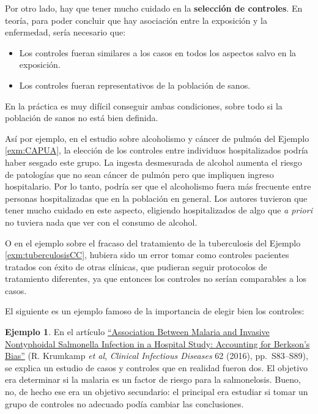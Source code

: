 \documentclass[
]{book}
\providecommand{\tightlist}{%
  \setlength{\itemsep}{0pt}\setlength{\parskip}{0pt}}
\theoremstyle{definition}
\theoremstyle{definition}
\newtheorem{example}{Ejemplo}[chapter]
\theoremstyle{definition}
\theoremstyle{definition}
\theoremstyle{remark}
\begin{document}
Por otro lado, hay que tener mucho cuidado en la \textbf{selección de controles}. En teoría, para poder concluir que hay asociación entre la exposición y la enfermedad, sería necesario que:

\begin{itemize}
\tightlist
\item
  Los controles fueran similares a los casos en todos los aspectos salvo en la exposición.
\item
  Los controles fueran representativos de la población de sanos.
\end{itemize}

En la práctica es muy difícil conseguir ambas condiciones, sobre todo si la población de sanos no está bien definida.

Así por ejemplo, en el estudio sobre alcoholismo y cáncer de pulmón del Ejemplo \ref{exm:CAPUA}, la elección de los controles entre individuos hospitalizados podría haber sesgado este grupo. La ingesta desmesurada de alcohol aumenta el riesgo de patologías que no sean cáncer de pulmón pero que impliquen ingreso hospitalario. Por lo tanto, podría ser que el alcoholismo fuera más frecuente entre personas hospitalizadas que en la población en general. Los autores tuvieron que tener mucho cuidado en este aspecto, eligiendo hospitalizados de algo que \emph{a priori} no tuviera nada que ver con el consumo de alcohol.

O en el ejemplo sobre el fracaso del tratamiento de la tuberculosis del Ejemplo \ref{exm:tuberculosisCC}, hubiera sido un error tomar como controles pacientes tratados con éxito de otras clínicas, que pudieran seguir protocolos de tratamiento diferentes, ya que entonces los controles no serían comparables a los casos.

El siguiente es un ejemplo famoso de la importancia de elegir bien los controles:

\begin{example}
\protect\hypertarget{exm:krunkamp}{}\label{exm:krunkamp}En el artículo \href{https://academic.oup.com/cid/article/62/suppl_1/S83/2566657}{``Association Between Malaria and Invasive Nontyphoidal Salmonella Infection in a Hospital Study: Accounting for Berkson's Bias''} (R. Krumkamp \emph{et al}, \emph{Clinical Infectious Diseases} 62 (2016), pp.~S83--S89), se explica un estudio de casos y controles que en realidad fueron dos. El objetivo era determinar si la malaria es un factor de riesgo para la salmonelosis. Bueno, no, de hecho ese era un objetivo secundario: el principal era estudiar si tomar un grupo de controles no adecuado podía cambiar las conclusiones.
\end{example}
\end{document}
